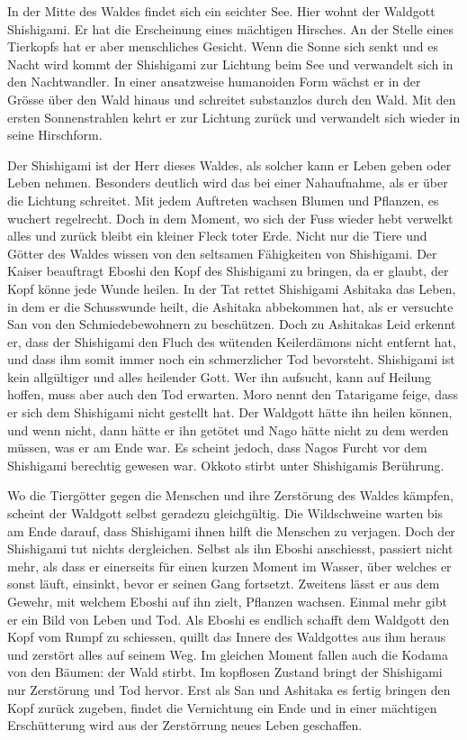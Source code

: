 In der Mitte des Waldes findet sich ein seichter See. Hier wohnt der Waldgott Shishigami. Er hat die Erscheinung eines mächtigen Hirsches. An der Stelle eines Tierkopfs hat er aber menschliches Gesicht. Wenn die Sonne sich senkt und es Nacht wird kommt der Shishigami zur Lichtung beim See und verwandelt sich in den Nachtwandler. In einer ansatzweise humanoiden Form wächst er in der Grösse über den Wald hinaus und schreitet substanzlos durch den Wald. Mit den ersten Sonnenstrahlen kehrt er zur Lichtung zurück und verwandelt sich wieder in seine Hirschform. 

Der Shishigami ist der Herr dieses Waldes, als solcher kann er Leben geben oder Leben nehmen. Besonders deutlich wird das bei einer Nahaufnahme, als er über die Lichtung schreitet. Mit jedem Auftreten wachsen Blumen und Pflanzen, es wuchert regelrecht. Doch in dem Moment, wo sich der Fuss wieder hebt verwelkt alles und zurück bleibt ein kleiner Fleck toter Erde. Nicht nur die Tiere und Götter des Waldes wissen von den seltsamen Fähigkeiten von Shishigami. Der Kaiser beauftragt Eboshi den Kopf des Shishigami zu bringen, da er glaubt, der Kopf könne jede Wunde heilen. In der Tat rettet Shishigami Ashitaka das Leben, in dem er die Schusswunde heilt, die Ashitaka abbekommen hat, als er versuchte San von den Schmiedebewohnern zu beschützen. Doch zu Ashitakas Leid erkennt er, dass der Shishigami den Fluch des wütenden Keilerdämons nicht entfernt hat, und dass ihm somit immer noch ein schmerzlicher Tod bevorsteht. Shishigami ist kein allgültiger und alles heilender Gott. Wer ihn aufsucht, kann auf Heilung hoffen, muss aber auch den Tod erwarten. Moro nennt den Tatarigame feige, dass er sich dem Shishigami nicht gestellt hat. Der Waldgott hätte ihn heilen können, und wenn nicht, dann hätte er ihn getötet und Nago hätte nicht zu dem werden müssen, was er am Ende war. Es scheint jedoch, dass Nagos Furcht vor dem Shishigami berechtig gewesen war. Okkoto stirbt unter Shishigamis Berührung. 

Wo die Tiergötter gegen die Menschen und ihre Zerstörung des Waldes kämpfen, scheint der Waldgott selbst geradezu gleichgültig. Die Wildschweine warten bis am Ende darauf, dass Shishigami ihnen hilft die Menschen zu verjagen. Doch der Shishigami tut nichts dergleichen. Selbst als ihn Eboshi anschiesst, passiert nicht mehr, als dass er einerseits für einen kurzen Moment im Wasser, über welches er sonst läuft, einsinkt, bevor er seinen Gang fortsetzt. Zweitens lässt er aus dem Gewehr, mit welchem Eboshi auf ihn zielt, Pflanzen wachsen. Einmal mehr gibt er ein Bild von Leben und Tod. Als Eboshi es endlich schafft dem Waldgott den Kopf vom Rumpf zu schiessen, quillt das Innere des Waldgottes aus ihm heraus und zerstört alles auf seinem Weg. Im gleichen Moment fallen auch die Kodama von den Bäumen: der Wald stirbt. Im kopflosen Zustand bringt der Shishigami nur Zerstörung und Tod hervor. Erst als San und Ashitaka es fertig bringen den Kopf zurück zugeben, findet die Vernichtung ein Ende und in einer mächtigen Erschütterung wird aus der Zerstörrung neues Leben geschaffen. 